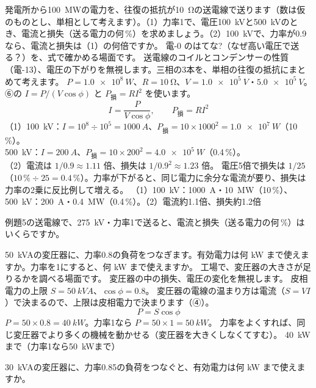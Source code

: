 \label{ph:電-11:ex5}
\begin{phreidai}[高い電圧で送る]
発電所から\qty{100}{MW}の電力を、往復の抵抗が\qty{10}{\ohm}の送電線で送ります（数は仮のものとし、単相として考えます）。（1）力率1で、電圧\qty{100}{kV}と\qty{500}{kV}のとき、電流と損失（送る電力の何\,\%）を求めましょう。（2）\qty{100}{kV}で、力率が0.9なら、電流と損失は（1）の何倍ですか。
\phbamen
電-0 のはてな?（なぜ高い電圧で送る？）を、式で確かめる場面です。
\phmushi
送電線のコイルとコンデンサーの性質（電-13）、電圧の下がりを無視します。三相の3本を、単相の往復の抵抗にまとめて考えます。
\phzu
$P=\qty{1.0e8}{W}$、$R=\qty{10}{\ohm}$、$V=\qty{1.0e5}{V}$・$\qty{5.0e5}{V}$。
\phriyu
⑥の $I=P/(V\cos\phi)$ と $P_{\text{損}}=RI^2$ を使います。
\phtateru
\[I=\frac{P}{V\cos\phi},\qquad P_{\text{損}}=RI^2\]
\phtoku
（1）\qty{100}{kV}：$I=10^8\div10^5=\qty{1000}{A}$、$P_{\text{損}}=10\times1000^2=\qty{1.0e7}{W}$（10\,\%）。\\
\phantom{（1）}\qty{500}{kV}：$I=\qty{200}{A}$、$P_{\text{損}}=10\times200^2=\qty{4.0e5}{W}$（0.4\,\%）。\\
（2）電流は $1/0.9\approx1.11$ 倍、損失は $1/0.9^2\approx1.23$ 倍。
\phtashikame
電圧5倍で損失は $1/25$（$10\,\%\div25=0.4\,\%$）。力率が下がると、同じ電力に余分な電流が要り、損失は力率の2乗に反比例して増える。
\kotae （1）\qty{100}{kV}：\qty{1000}{A}・\qty{10}{MW}（10\,\%）、\qty{500}{kV}：\qty{200}{A}・\qty{0.4}{MW}（0.4\,\%）。（2）電流約1.1倍、損失約1.2倍
\end{phreidai}
\begin{jibun}
例題5の送電線で、\qty{275}{kV}・力率1で送ると、電流と損失（送る電力の何\,\%）はいくらですか。
\end{jibun}

\label{ph:電-11:ex6}
\begin{phreidai}
\qty{50}{kVA}の変圧器に、力率0.8の負荷をつなぎます。有効電力は何 kW まで使えますか。力率を1にすると、何 kW まで使えますか。
\phbamen
工場で、変圧器の大きさが足りるかを調べる場面です。
\phmushi
変圧器の中の損失、電圧の変化を無視します。
\phzu
皮相電力の上限 $S=\qty{50}{kVA}$、$\cos\phi=0.8$。
\phriyu
変圧器の電線の温まり方は電流（$S=VI$）で決まるので、上限は皮相電力で決まります（④）。
\phtateru
\[P=S\cos\phi\]
\phtoku
$P=50\times0.8=\qty{40}{kW}$。力率1なら $P=50\times1=\qty{50}{kW}$。
\phtashikame
力率をよくすれば、同じ変圧器でより多くの機械を動かせる（変圧器を大きくしなくてすむ）。
\kotae \qty{40}{kW}まで（力率1なら\qty{50}{kW}まで）
\end{phreidai}
\begin{jibun}
\qty{30}{kVA}の変圧器に、力率0.85の負荷をつなぐと、有効電力は何 kW まで使えますか。
\end{jibun}

